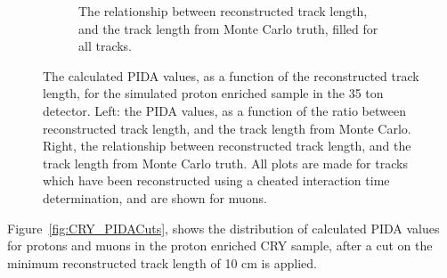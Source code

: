 \begin{figure}
\begin{subfigure}{0.48\textwidth}
        \caption{The relationship between reconstructed track length, and the track length from Monte Carlo truth, filled for all tracks.}
        \label{fig:CRY_MCRecoTrack_Muon_All}
  \end{subfigure}
  \caption[The calculated PIDA values, as a function of the reconstructed track length, for the simulated proton enriched sample in the 35 ton detector]
          {The calculated PIDA values, as a function of the reconstructed track length, for the simulated proton enriched sample in the 35 ton detector. Left: the PIDA values, as a function of the ratio between reconstructed track length, and the track length from Monte Carlo. Right, the relationship between reconstructed track length, and the track length from Monte Carlo truth. All plots are made for tracks which have been reconstructed using a cheated interaction time determination, and are shown for muons.}
  \label{fig:CRY_MuonAllComp}
\end{figure}

Figure~\ref{fig:CRY_PIDACuts}, shows the distribution of calculated PIDA values for protons and muons in the proton enriched CRY sample, after a cut on the minimum reconstructed track length of 10 cm is applied. \\

